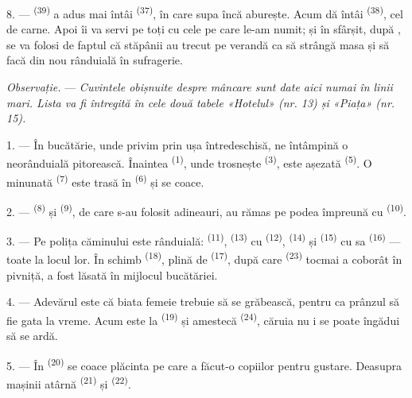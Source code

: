 8. ---  \textsuperscript{(39)} a adus mai întâi 
\textsuperscript{(37)}, în care supa încă aburește. Acum dă  întâi
\textsuperscript{(38)}, cel de carne. Apoi îi va servi pe toți cu cele pe care
le-am numit; și în sfârșit, după , se va folosi de faptul că
stăpânii au trecut pe verandă ca să strângă masa și să facă din nou rânduială în
sufragerie.

\textit{Observație.} --- \textit{Cuvintele obișnuite despre mâncare sunt date aici
numai în linii mari. Lista va fi întregită în cele două tabele «Hotelul» (nr. 13)
și «Piața» (nr. 15).}

\VUsaut{4.6mm}
\VUsaut{3.0mm}

1. --- În bucătărie, unde privim prin ușa întredeschisă, ne întâmpină o
neorânduială pitorească. Înaintea  \textsuperscript{(1)}, unde
trosnește  \textsuperscript{(3)}, este așezată  \textsuperscript{(5)}. O  minunată \textsuperscript{(7)}
este trasă în  \textsuperscript{(6)} și se coace.

2. ---  \textsuperscript{(8)} și 
\textsuperscript{(9)}, de care s-au folosit adineauri, au rămas pe podea împreună
cu  \textsuperscript{(10)}.

3. --- Pe polița căminului este rânduială: 
\textsuperscript{(11)},  \textsuperscript{(13)} cu
 \textsuperscript{(12)}, 
\textsuperscript{(14)} și  \textsuperscript{(15)} cu
 sa \textsuperscript{(16)} --- toate la locul lor. În schimb
 \textsuperscript{(18)}, plină de
 \textsuperscript{(17)}, după care 
\textsuperscript{(23)} tocmai a coborât în pivniță, a fost lăsată în mijlocul
bucătăriei.

4. --- Adevărul este că biata femeie trebuie să se grăbească, pentru ca prânzul să
fie gata la vreme. Acum este la  \textsuperscript{(19)} și
amestecă  \textsuperscript{(24)}, căruia nu i se poate îngădui să se
ardă.

5. --- În  \textsuperscript{(20)} se coace plăcinta pe care a
făcut-o copiilor pentru gustare. Deasupra mașinii atârnă 
\textsuperscript{(21)} și  \textsuperscript{(22)}.

